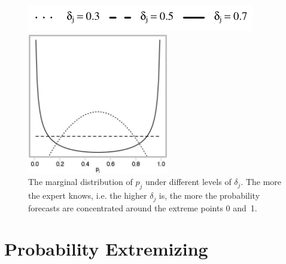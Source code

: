 \documentclass[11pt]{article}
\theoremstyle{definition}
\theoremstyle{definition}
\begin{document}
\begin{figure}[t]
\centering
	\hspace{0em}\includegraphics{LegendMarginal}

 \includegraphics[width= 0.55\textwidth]{Marginals}
   \caption{The marginal distribution of $p_j$ under different levels of 
$\delta_j$.  The more the expert knows, i.e. the higher $\delta_j$ is, 
the more the probability forecasts are concentrated around the extreme 
points 0 and~1.}
\label{marginals}
\end{figure}

\section{Probability Extremizing}
\label{extremizing}
\end{document}
